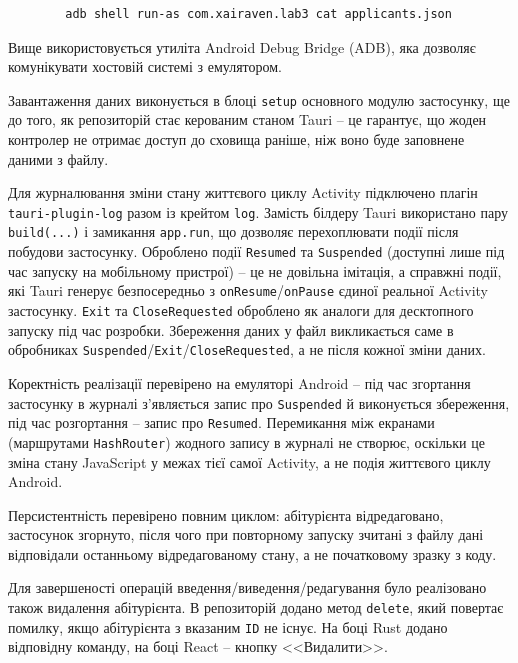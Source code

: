 \documentclass[14pt, a4paper]{extreport}
\begin{document}
	\begin{verbatim}
		adb shell run-as com.xairaven.lab3 cat applicants.json
	\end{verbatim}
	
	Вище використовується утиліта Android Debug Bridge (ADB), яка дозволяє комунікувати хостовій системі з емулятором.
	
	
	Завантаження даних виконується в блоці \texttt{setup} основного модулю застосунку, ще до того, як репозиторій стає керованим станом Tauri -- це гарантує, що жоден контролер не отримає доступ до сховища раніше, ніж воно буде заповнене даними з файлу.

	Для журналювання зміни стану життєвого циклу Activity підключено плагін \texttt{tauri-plugin-log} разом із крейтом \texttt{log}. Замість білдеру Tauri використано пару \texttt{build(...)} і замикання \texttt{app.run}, що дозволяє перехоплювати події після побудови застосунку. Оброблено події \texttt{Resumed} та \texttt{Suspended} (доступні лише під час запуску на мобільному пристрої) -- це не довільна імітація, а справжні події, які Tauri генерує безпосередньо з \texttt{onResume}/\texttt{onPause} єдиної реальної Activity застосунку. \texttt{Exit} та \texttt{CloseRequested} оброблено як аналоги для десктопного запуску під час розробки. Збереження даних у файл викликається саме в обробниках \texttt{Suspended}/\texttt{Exit}/\texttt{CloseRequested}, а не після кожної зміни даних.

	Коректність реалізації перевірено на емуляторі Android -- під час згортання застосунку в журналі з'являється запис про \texttt{Suspended} й виконується збереження, під час розгортання -- запис про \texttt{Resumed}. Перемикання між екранами (маршрутами \texttt{HashRouter}) жодного запису в журналі не створює, оскільки це зміна стану JavaScript у межах тієї самої Activity, а не подія життєвого циклу Android. 
	
	
	Персистентність перевірено повним циклом: абітурієнта відредаговано, застосунок згорнуто, після чого при повторному запуску зчитані з файлу дані відповідали останньому відредагованому стану, а не початковому зразку з коду.

	Для завершеності операцій введення/виведення/редагування було реалізовано також видалення абітурієнта. В репозиторій додано метод \texttt{delete}, який повертає помилку, якщо абітурієнта з вказаним \texttt{ID} не існує. На боці Rust додано відповідну команду, на боці React -- кнопку <<Видалити>>.
	
\end{document}
